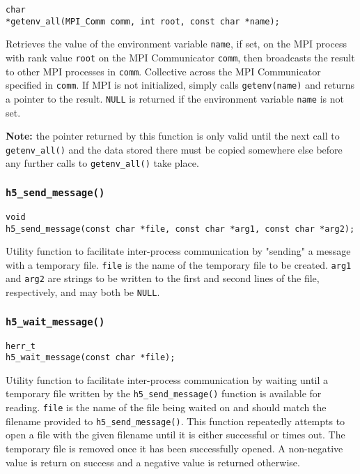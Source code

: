 \documentclass[../HDF5_RFC.tex]{subfiles}
\begin{document}
\begin{verbatim}
char
*getenv_all(MPI_Comm comm, int root, const char *name);
\end{verbatim}

Retrieves the value of the environment variable \texttt{name}, if set, on the MPI process with rank
value \texttt{root} on the MPI Communicator \texttt{comm}, then broadcasts the result to other MPI
processes in \texttt{comm}. Collective across the MPI Communicator specified in \texttt{comm}.
If MPI is not initialized, simply calls \texttt{getenv(name)} and returns a pointer to the result.
\texttt{NULL} is returned if the environment variable \texttt{name} is not set.

\textbf{Note:} the pointer returned by this function is only valid until the next call to
\texttt{getenv\_all()} and the data stored there must be copied somewhere else before any further calls
to \texttt{getenv\_all()} take place.

\subsubsection{\texttt{h5\_send\_message()}}

\begin{verbatim}
void
h5_send_message(const char *file, const char *arg1, const char *arg2);
\end{verbatim}

Utility function to facilitate inter-process communication by "sending" a message with a temporary
file. \texttt{file} is the name of the temporary file to be created. \texttt{arg1} and \texttt{arg2}
are strings to be written to the first and second lines of the file, respectively, and may both be
\texttt{NULL}.

\subsubsection{\texttt{h5\_wait\_message()}}

\begin{verbatim}
herr_t
h5_wait_message(const char *file);
\end{verbatim}

Utility function to facilitate inter-process communication by waiting until a temporary file written by
the \texttt{h5\_send\_message()} function is available for reading. \texttt{file} is the name of the file
being waited on and should match the filename provided to \texttt{h5\_send\_message()}. This
function repeatedly attempts to open a file with the given filename until it is either successful
or times out. The temporary file is removed once it has been successfully opened. A non-negative value
is return on success and a negative value is returned otherwise.
\end{document}
